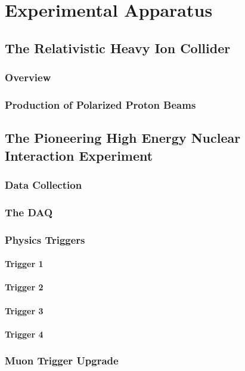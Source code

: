 \chapter{Experimental Apparatus}
\section{The Relativistic Heavy Ion Collider}
\subsection{Overview}
\subsection{Production of Polarized Proton Beams}
\section{The Pioneering High Energy Nuclear Interaction Experiment}
\subsection{Data Collection}
\subsection{The DAQ}
\subsection{Physics Triggers}
\subsubsection{Trigger 1}
\subsubsection{Trigger 2}
\subsubsection{Trigger 3}
\subsubsection{Trigger 4}
\subsection{Muon Trigger Upgrade}
